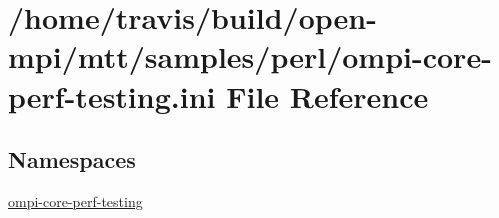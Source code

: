 \hypertarget{ompi-core-perf-testing_8ini}{\section{/home/travis/build/open-\/mpi/mtt/samples/perl/ompi-\/core-\/perf-\/testing.ini File Reference}
\label{ompi-core-perf-testing_8ini}
}
\subsection*{Namespaces}
\begin{DoxyCompactItemize}
\item 
\hyperlink{namespaceompi-core-perf-testing}{ompi-\/core-\/perf-\/testing}
\end{DoxyCompactItemize}
